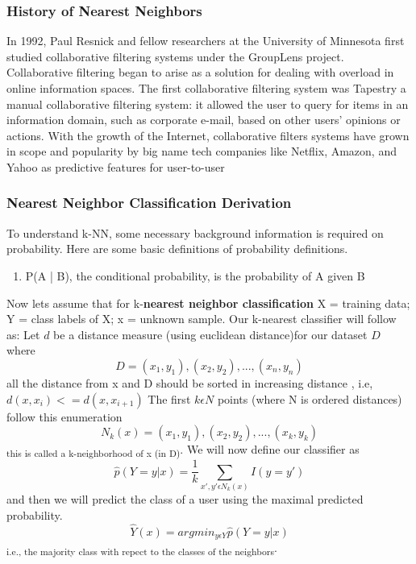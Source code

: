 \documentclass{report}
\begin{document}
\subsubsection*{History of Nearest Neighbors}

In 1992, Paul Resnick and fellow researchers at the University of Minnesota first studied collaborative filtering systems under the GroupLens project\cite{2}.  Collaborative filtering began to arise as a solution for dealing with overload in online information spaces. The first collaborative filtering system was Tapestry
a manual collaborative filtering system: it allowed the user to query for
items in an information domain, such as corporate e-mail, based on
other users’ opinions or actions\cite{6}. With the growth of the Internet, collaborative filters systems have grown in scope and popularity by big name tech companies like Netflix, Amazon, and Yahoo as predictive features for user-to-user 

\subsubsection{Nearest Neighbor Classification Derivation}
To understand k-NN, some necessary background information is required on probability. Here are some basic definitions of probability definitions. \cite{4}
\begin{enumerate}
	\item P(A | B), the conditional probability, is the probability of A given B
\end{enumerate}
Now lets assume that for  k-\textbf{nearest neighbor classification }  X = training data; Y = class labels of X; x = unknown sample.
Our k-nearest classifier will follow as:
Let $d$ be a distance measure (using euclidean distance)for our dataset $D$ where
\begin{equation}
D = (x_{1}, y_{1}), (x_{2}, y_{2}), ... , (x_{n}, y_{n})
\end{equation}
all the distance from x and D should be sorted in increasing distance , i.e,
$d(x,x_{i}) <= d(x,x_{i+1})$ \newline
The first $k \epsilon N$ points (where N is ordered distances) follow this  enumeration 
\begin{equation}
N_{k}(x) = (x_{1}, y_{1}), (x_{2}, y_{2}), ... , (x_{k}, y_{k}) 
\end{equation} 
\textsubscript{this is called a k-neighborhood of x (in D)}. \newline\newline
We will now define our classifier as 
\begin{equation}
\hat{p}(Y = y | x) = \frac{1}{k} \sum_{x',y' \epsilon N_{k}(x) }  I(y = y')
\end{equation}
and then we will predict the class of a user using the maximal predicted probability.
\begin{equation}
\hat{Y}(x) = argmin_{y \epsilon Y} \hat{p}(Y = y |x)
\end{equation}
\textsubscript{i.e., the majority class with repect to the classes of the neighbors}. \newline\newline
\end{document}
